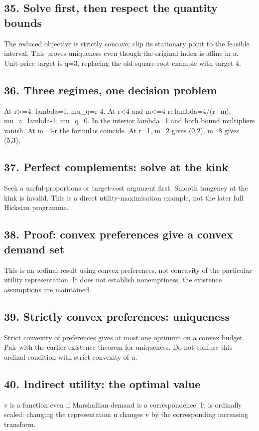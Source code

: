\documentclass[11pt,a4paper]{article}
\begin{document}
\subsection*{35. Solve first, then respect the quantity bounds}
The reduced objective is strictly concave; clip its stationary point to the feasible interval. This proves uniqueness even though the original index is affine in a. Unit-price target is q=3, replacing the old square-root example with target 4.

\subsection*{36. Three regimes, one decision problem}
At r>=4: lambda=1, mu\_q=r-4. At r<4 and m<=4-r: lambda=4/(r+m), mu\_a=lambda-1, mu\_q=0. In the interior lambda=1 and both bound multipliers vanish. At m=4-r the formulas coincide. At r=1, m=2 gives (0,2), m=8 gives (5,3).

\subsection*{37. Perfect complements: solve at the kink}
Seek a useful-proportions or target-cost argument first. Smooth tangency at the kink is invalid. This is a direct utility-maximisation example, not the later full Hicksian programme.

\subsection*{38. Proof: convex preferences give a convex demand set}
This is an ordinal result using convex preferences, not concavity of the particular utility representation. It does not establish nonemptiness; the existence assumptions are maintained.

\subsection*{39. Strictly convex preferences: uniqueness}
Strict convexity of preferences gives at most one optimum on a convex budget. Pair with the earlier existence theorem for uniqueness. Do not confuse this ordinal condition with strict convexity of u.

\subsection*{40. Indirect utility: the optimal value}
v is a function even if Marshallian demand is a correspondence. It is ordinally scaled: changing the representation u changes v by the corresponding increasing transform.
\end{document}
